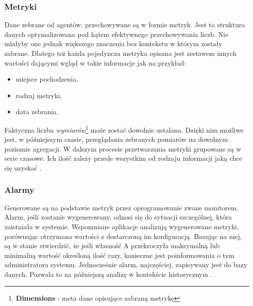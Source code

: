         \subsubsection{Metryki}
        Dane zebrane od agentów, przechowywane są w formie metryk. Jest to struktura danych optymalizowana pod kątem
        efektywnego przechowywania liczb. Nie miałyby one jednak większego znaczenia bez kontekstu w którym zostały
        zabrane. Dlatego też każda pojedyncza metryka opisana jest zestawem innych wartości dającymi wgląd w takie
        informacje jak na przykład:
        \begin{itemize}
            \item miejsce pochodzenia,
            \item rodzaj metryki,
            \item data zebrania.
        \end{itemize}
        Faktyczna liczba \textit{wymiarów}\footnote{\textbf{Dimensions} - meta dane opisujące zabraną metrykę} może
        zostać dowolnie ustalana. Dzięki nim możliwe jest, w późniejszym czasie, przeglądania zebranych pomiarów
        na dowolnym poziomie agregacji. W dalszym procesie przetwarzania metryki grupowane są w serie czasowe. Ich ilość
        zależy przede wszystkim od rodzaju informacji jaką chce się uzyskać \cite{monitoring_and_alerting}.
        
        \subsubsection{Alarmy}
        Generowane są na podstawie metryk przez oprogramowanie zwane monitorem. Alarm, jeśli zostanie wygenerowany, 
        odnosi się do sytuacji szczególnej, która zaistniała w systemie. Wspomniane aplikacje analizują wygenerowane metryki, 
        porównując otrzymana wartości z dostarczoną im konfiguracją. Bazując na niej, są w stanie stwierdzić, że jeśli
        własność A przekroczyła maksymalną lub minimalną wartość określoną ilość razy, konieczne jest poinformowania o tym
        administratora systemu. Jednocześnie alarm, najczęściej, zapisywany jest do bazy danych. Pozwala to na późniejszą analizę 
        w kontekście historycznym \cite{monitoring_and_alerting}. 
        
